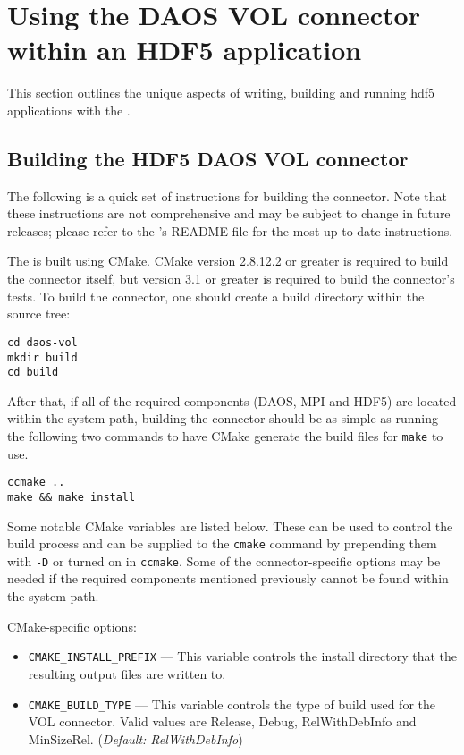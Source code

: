 \documentclass[../users_guide.tex]{subfiles}
\begin{document}
\section{Using the DAOS VOL connector within an HDF5 application}

This section outlines the unique aspects of writing, building and running
\acrshort{hdf5} applications with the \dvc{}.

\subsection{Building the HDF5 DAOS VOL connector}

The following is a quick set of instructions for building the \dvc{} connector.
Note that these instructions are not comprehensive and may be subject to change
in future releases; please refer to the \dvc{}'s README file for the most up to
date instructions.

The \dvc{} is built using CMake. CMake version 2.8.12.2 or greater is required
to build the connector itself, but version 3.1 or greater is required to build
the connector's tests. To build the connector, one should create a build
directory within the source tree:

\begin{verbatim}
cd daos-vol
mkdir build
cd build
\end{verbatim}

After that, if all of the required components (DAOS, MPI and HDF5) are
located within the system path, building the connector should be as simple as
running the following two commands to have CMake generate the build files for
\texttt{make} to use.

\begin{verbatim}
ccmake ..
make && make install
\end{verbatim}

Some notable CMake variables are listed below. These can be used to control
the build process and can be supplied to the \texttt{cmake} command by
prepending them with \texttt{-D} or turned on in \texttt{ccmake}. Some of the
connector-specific options may be needed if the required components mentioned
previously cannot be found within the system path.

CMake-specific options:

\begin{itemize}
  \item \texttt{CMAKE\_INSTALL\_PREFIX} --- This variable controls the install directory that the resulting output files are written to.
  \item \texttt{CMAKE\_BUILD\_TYPE} --- This variable controls the type of build used for the VOL connector. Valid values are Release, Debug, RelWithDebInfo and MinSizeRel. (\textit{Default: RelWithDebInfo})
\end{itemize}
\end{document}
